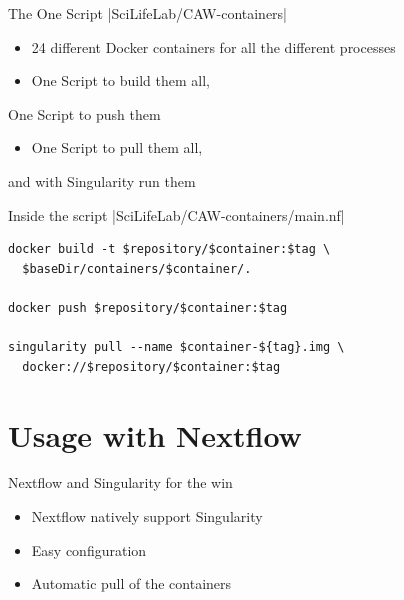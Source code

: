 \documentclass{beamer}
\begin{document}
\begin{frame}{The One Script}
	|SciLifeLab/CAW-containers|
	\begin{itemize}
		\item 24 different Docker containers for all the different processes
		\pause
		\item One Script to build them all,
		\pause
	\end{itemize}
	\hfill One Script to push them \hspace{1.5cm}
	\pause
	\begin{itemize}
		\item One Script to pull them all,
	\end{itemize}
	\pause
	\hfill and with Singularity run them \hspace{1.5cm}
\end{frame}

\begin{frame}[fragile]{Inside the script}
|SciLifeLab/CAW-containers/main.nf|
\begin{verbatim}
docker build -t $repository/$container:$tag \
  $baseDir/containers/$container/.

docker push $repository/$container:$tag

singularity pull --name $container-${tag}.img \
  docker://$repository/$container:$tag
\end{verbatim}
\end{frame}

\section{Usage with Nextflow}

\begin{frame}{Nextflow and Singularity for the win}
	\vspace{-3cm}
	\begin{itemize}
		\item Nextflow natively support Singularity
		\pause
		\item Easy configuration
		\pause
		\item Automatic pull of the containers
	\end{itemize}
\end{frame}
\end{document}
